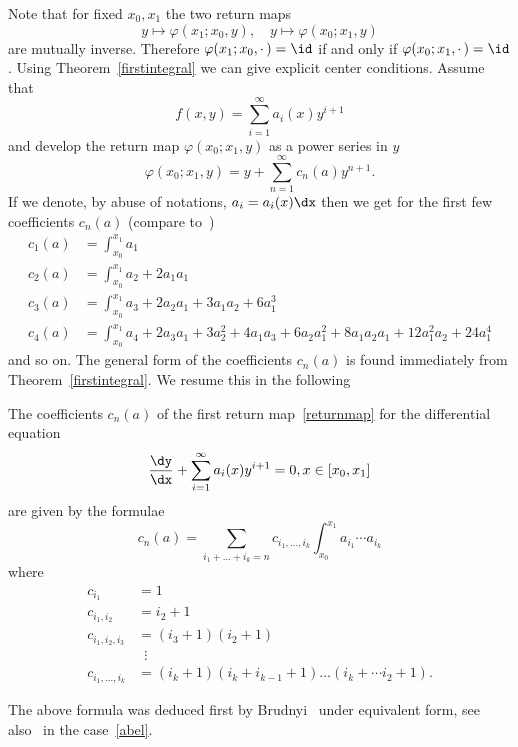 Note that for fixed $x_0,x_1$ the two return maps
\[
y \mapsto \varphi(x_1;x_0,y), \quad y \mapsto \varphi(x_0;x_1,y)
\]
are mutually inverse. Therefore $\varphi(x_1;x_0,{\cdot\,}) = \id$ if and only if $ \varphi(x_0;x_1,{\cdot\,}) = \id$. Using Theorem~\ref{firstintegral} we can give explicit center conditions. Assume that
\[
f(x,y) = \sum_{i=1}^\infty a_i(x) y^{i+1}
\]
and develop the return map $ \varphi(x_0;x_1,y) $ as a power series in $y$
\begin{equation}\label{returnmap}
\varphi(x_0;x_1,y) = y + \sum_{n=1}^\infty c_n(a) y^{n+1}.
\end{equation}
If we denote, by abuse of notations, $a_{i}= a_{i}(x) \dx $ then we get for the first few coefficients $c_n(a)$ (compare to~\cite[p.~450]{bry10})
\begin{align*}
c_1(a) & = \int_{x_0}^{x_1} a_1 \\
c_2(a) & = \int_{x_0}^{x_1} a_2 + 2 a_1a_1\\
c_3(a) & = \int_{x_0}^{x_1} a_3 + 2 a_2 a_1 + 3 a_1a_2 + 6 a_1^3 \\
c_4(a) & = \int_{x_0}^{x_1} a_4 + 2 a_3 a_1 + 3 a_2^2 + 4 a_1a_3 + 6a_2a_1^2 + 8 a_1a_2a_1 + 12 a_1^2a_2 + 24 a_1^4
\end{align*}
and so on. The general form of the coefficients $c_n(a)$ is found immediately from Theorem~\ref{firstintegral}. We resume this in the following



\begin{theo}\label{brf}
The coefficients $c_n(a)$ of the first return map~\eqref{returnmap} for the differential equation
\[
\frac{\dy}{\dx} + \sum_{i=1}^\infty a_i(x) y^{i+1} = 0, x\in [x_0,x_1]
\]
are given by the formulae
\[
c_n(a) = \sum_{i_1+\dots + i_k=n} c_{i_1,\dots,i_k} \int_{x_0}^{x_1} a_{i_1} \cdots a_{i_k}
\]
where
\begin{align*}
c_{i_1} & = 1\\
c_{i_1,i_2} & = i_2+1 \\
c_{i_1,i_2,i_3} & = (i_3+1)(i_2+1)\\
& \;\:\vdots \\
c_{i_1,\dots,i_k} & = (i_k+1)(i_k+i_{k-1} +1) \dots (i_k + \cdots i_2 +1).
\end{align*}
\end{theo}

The above formula was deduced first by Brudnyi~\cite[p.~422]{brud06} under equivalent form, see also~\cite[Proposition~2.4]{bry10} in the case~\eqref{abel}.

